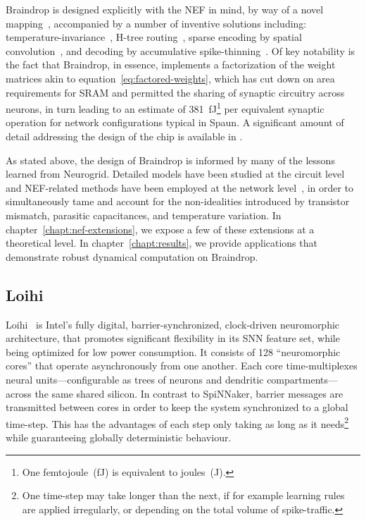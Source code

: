 Braindrop is designed explicitly with the NEF in mind, by way of a novel mapping~\citep{voelker2017iscas, neckar2018optimizing}, accompanied by a number of inventive solutions including: temperature-invariance~\citep{abrams2017, reidpint2019, benjamintemp2019}, H-tree routing~\citep{fokserial2018}, sparse encoding by spatial convolution~\citep{feinstein1988hexagonal, braindrop2019}, and decoding by accumulative spike-thinning~\citep{fokthinning2019}.
Of key notability is the fact that Braindrop, in essence, implements a factorization of the weight matrices akin to equation~\ref{eq:factored-weights}, which has cut down on area requirements for SRAM and permitted the sharing of synaptic circuitry across neurons, in turn leading to an estimate of 381~fJ\footnote{
One femtojoule~(fJ) is equivalent to  joules~(J).}
per equivalent synaptic operation for network configurations typical in Spaun.
A significant amount of detail addressing the design of the chip is available in \citet{neckar2018braindrop, fok2018communicating, braindrop2019}.

As stated above, the design of Braindrop is informed by many of the lessons learned from Neurogrid.
Detailed models have been studied at the circuit level~\citep{benjamintemp2019} and NEF-related methods have been employed at the network level~\citep{voelker2017iscas, reidpint2019}, in order to simultaneously tame and account for the non-idealities introduced by transistor mismatch, parasitic capacitances, and temperature variation.
In chapter~\ref{chapt:nef-extensions}, we expose a few of these extensions at a theoretical level.
In chapter~\ref{chapt:results}, we provide applications that demonstrate robust dynamical computation on Braindrop.



\subsection{Loihi}

Loihi~\citep{davies2018loihi} is Intel's fully digital, barrier-synchronized, clock-driven neuromorphic architecture, that promotes significant flexibility in its SNN feature set, while being optimized for low power consumption.
It consists of 128 ``neuromorphic cores'' that operate asynchronously from one another.
Each core time-multiplexes  neural units---configurable as trees of neurons and dendritic compartments---across the same shared silicon.
In contrast to SpiNNaker, barrier messages are transmitted between cores in order to keep the system synchronized to a global time-step.
This has the advantages of each step only taking as long as it needs\footnote{
One time-step may take longer than the next, if for example learning rules are applied irregularly, or depending on the total volume of spike-traffic.} 
while guaranteeing globally deterministic behaviour.

